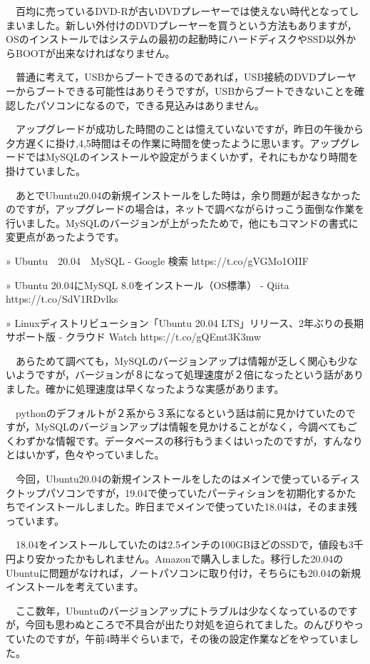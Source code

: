 \documentclass[]{ltjarticle}
\begin{document}
　百均に売っているDVD-Rが古いDVDプレーヤーでは使えない時代となってしまいました。新しい外付けのDVDプレーヤーを買うという方法もありますが，OSのインストールではシステムの最初の起動時にハードディスクやSSD以外からBOOTが出来なければなりません。

　普通に考えて，USBからブートできるのであれば，USB接続のDVDプレーヤーからブートできる可能性はありそうですが，USBからブートできないことを確認したパソコンになるので，できる見込みはありません。

　アップグレードが成功した時間のことは憶えていないですが，昨日の午後から夕方遅くに掛け,4,5時間はその作業に時間を使ったように思います。アップグレードではMySQLのインストールや設定がうまくいかず，それにもかなり時間を掛けていました。

　あとでUbuntu20.04の新規インストールをした時は，余り問題が起きなかったのですが，アップグレードの場合は，ネットで調べながらけっこう面倒な作業を行いました。MySQLのバージョンが上がったためで，他にもコマンドの書式に変更点があったようです。

» Ubuntu　20.04　MySQL - Google 検索 https://t.co/gVGMo1OIIF

» Ubuntu 20.04にMySQL 8.0をインストール（OS標準） - Qiita
https://t.co/SdV1RDvlks

» Linuxディストリビューション「Ubuntu 20.04
LTS」リリース、2年ぶりの長期サポート版 - クラウド Watch
https://t.co/gQEmt3K3mw

　あらためて調べても，MySQLのバージョンアップは情報が乏しく関心も少ないようですが，バージョンが８になって処理速度が２倍になったという話がありました。確かに処理速度は早くなったような実感があります。

　pythonのデフォルトが２系から３系になるという話は前に見かけていたのですが，MySQLのバージョンアップは情報を見かけることがなく，今調べてもごくわずかな情報です。データベースの移行もうまくはいったのですが，すんなりとはいかず，色々やっていました。

　今回，Ubuntu20.04の新規インストールをしたのはメインで使っているディスクトップパソコンですが，19.04で使っていたパーティションを初期化するかたちでインストールしました。昨日までメインで使っていた18.04は，そのまま残っています。

　18.04をインストールしていたのは2.5インチの100GBほどのSSDで，値段も3千円より安かったかもしれません。Amazonで購入しました。移行した20.04のUbuntuに問題がなければ，ノートパソコンに取り付け，そちらにも20.04の新規インストールを考えています。

　ここ数年，Ubuntuのバージョンアップにトラブルは少なくなっているのですが，今回も思わぬところで不具合が出たり対処を迫られてました。のんびりやっていたのですが，午前4時半ぐらいまで，その後の設定作業などをやっていました。
\end{document}
